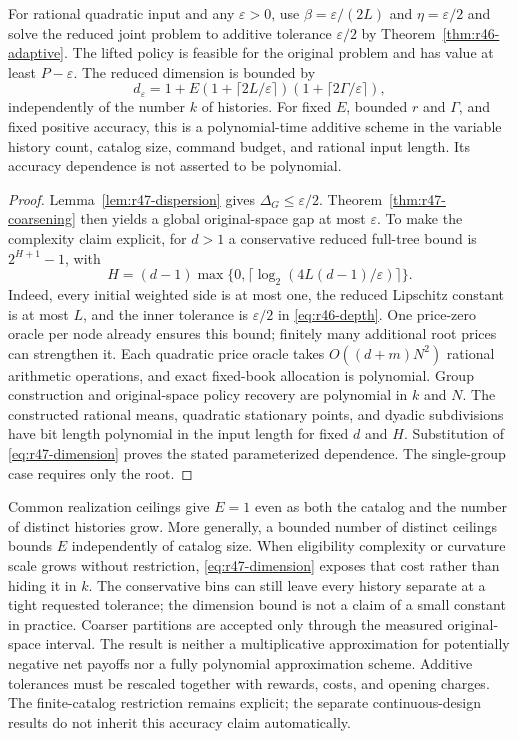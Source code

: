 \begin{theorem}\label{thm:r47-variable}
For rational quadratic input and any $\varepsilon>0$, use
$\beta=\varepsilon/(2L)$ and $\eta=\varepsilon/2$ and solve the reduced joint problem to additive tolerance $\varepsilon/2$ by Theorem~\ref{thm:r46-adaptive}. The lifted policy is feasible for the original problem and has value at least $P-\varepsilon$. The reduced dimension is bounded by
\begin{equation}\label{eq:r47-dimension}
 d_\varepsilon=1+E(1+\lceil2L/\varepsilon\rceil)
                    (1+\lceil2\Gamma/\varepsilon\rceil),
\end{equation}
independently of the number $k$ of histories. For fixed $E$, bounded $r$ and $\Gamma$, and fixed positive accuracy, this is a polynomial-time additive scheme in the variable history count, catalog size, command budget, and rational input length. Its accuracy dependence is not asserted to be polynomial.
\end{theorem}
\begin{proof}
Lemma~\ref{lem:r47-dispersion} gives $\Delta_G\leq\varepsilon/2$. Theorem~\ref{thm:r47-coarsening} then yields a global original-space gap at most $\varepsilon$. To make the complexity claim explicit, for $d>1$ a conservative reduced full-tree bound is $2^{H+1}-1$, with
\[
 H=(d-1)\max\{0,\lceil\log_2(4L(d-1)/\varepsilon)\rceil\}.
\]
Indeed, every initial weighted side is at most one, the reduced Lipschitz constant is at most $L$, and the inner tolerance is $\varepsilon/2$ in \eqref{eq:r46-depth}. One price-zero oracle per node already ensures this bound; finitely many additional root prices can strengthen it. Each quadratic price oracle takes $O((d+m)N^2)$ rational arithmetic operations, and exact fixed-book allocation is polynomial. Group construction and original-space policy recovery are polynomial in $k$ and $N$. The constructed rational means, quadratic stationary points, and dyadic subdivisions have bit length polynomial in the input length for fixed $d$ and $H$. Substitution of \eqref{eq:r47-dimension} proves the stated parameterized dependence. The single-group case requires only the root.
\end{proof}

Common realization ceilings give $E=1$ even as both the catalog and the number of distinct histories grow. More generally, a bounded number of distinct ceilings bounds $E$ independently of catalog size. When eligibility complexity or curvature scale grows without restriction, \eqref{eq:r47-dimension} exposes that cost rather than hiding it in $k$. The conservative bins can still leave every history separate at a tight requested tolerance; the dimension bound is not a claim of a small constant in practice. Coarser partitions are accepted only through the measured original-space interval. The result is neither a multiplicative approximation for potentially negative net payoffs nor a fully polynomial approximation scheme. Additive tolerances must be rescaled together with rewards, costs, and opening charges. The finite-catalog restriction remains explicit; the separate continuous-design results do not inherit this accuracy claim automatically.

